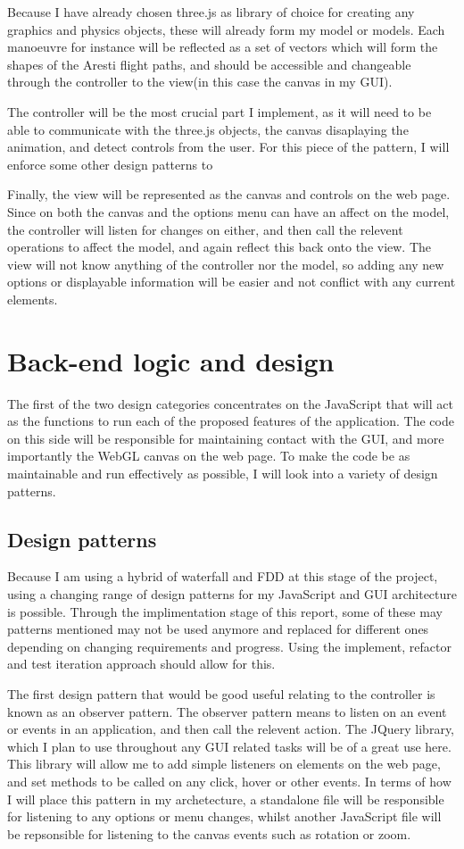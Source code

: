 Because I have already chosen three.js as library of choice for creating any graphics and physics objects, these will already form my model or models. Each manoeuvre for instance will be reflected as a set of vectors which will form the shapes of the Aresti flight paths, and should be accessible and changeable through the controller to the view(in this case the canvas in my GUI).

The controller will be the most crucial part I implement, as it will need to be able to communicate with the three.js objects, the canvas disaplaying the animation, and detect controls from the user. For this piece of the pattern, I will enforce some other design patterns to 

Finally, the view will be represented as the canvas and controls on the web page. Since on both the canvas and the options menu can have an affect on the model, the controller will listen for changes on either, and then call the relevent operations to affect the model, and again reflect this back onto the view. The view will not know anything of the controller nor the model, so adding any new options or displayable information will be easier and not conflict with any current elements.

\section{Back-end logic and design}
The first of the two design categories concentrates on the JavaScript that will act as the functions to run each of the proposed features of the application. The code on this side will be responsible for maintaining contact with the GUI, and more importantly the WebGL canvas on the web page. To make the code be as maintainable and run effectively as possible, I will look into a variety of design patterns.

\subsection{Design patterns}
Because I am using a hybrid of waterfall and FDD at this stage of the project, using a changing range of design patterns for my JavaScript and GUI architecture is possible. Through the implimentation stage of this report, some of these may patterns mentioned may not be used anymore and replaced for different ones depending on changing requirements and progress. Using the implement, refactor and test iteration approach should allow for this.

The first design pattern that would be good useful relating to the controller is known as an observer pattern. The observer pattern means to listen on an event or events in an application, and then call the relevent action. The JQuery library, which I plan to use throughout any GUI related tasks will be of a great use here. This library will allow me to add simple listeners on elements on the web page, and set methods to be called on any click, hover or other events. In terms of how I will place this pattern in my archetecture, a standalone file will be responsible for listening to any options or menu changes, whilst another JavaScript file will be repsonsible for listening to the canvas events such as rotation or zoom.

